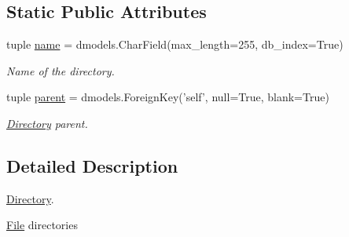\subsection*{Static Public Attributes}
\begin{DoxyCompactItemize}
\item 
tuple \hyperlink{classcore_1_1models_1_1Directory_a1d5a9f2dd8f591cf1bd6410dee7d3b26}{name} = dmodels.\-Char\-Field(max\-\_\-length=255, db\-\_\-index=True)
\begin{DoxyCompactList}\small\item\em Name of the directory. \end{DoxyCompactList}\item 
tuple \hyperlink{classcore_1_1models_1_1Directory_ad0341e7ba04c23d665cb318ebee17c2b}{parent} = dmodels.\-Foreign\-Key('self', null=True, blank=True)
\begin{DoxyCompactList}\small\item\em \hyperlink{classcore_1_1models_1_1Directory}{Directory} parent. \end{DoxyCompactList}\end{DoxyCompactItemize}


\subsection{Detailed Description}
\hyperlink{classcore_1_1models_1_1Directory}{Directory}. 

\hyperlink{classcore_1_1models_1_1File}{File} directories 

